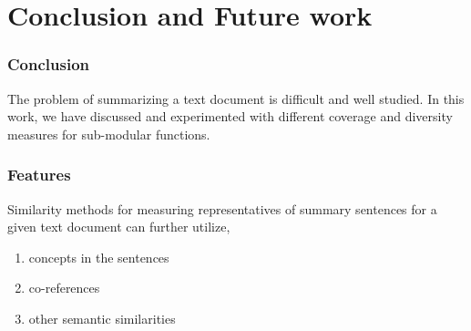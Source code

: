 \chapter{Conclusion and Future work}

\subsection{Conclusion}

The problem of summarizing a text document is difficult and well studied. In this work, we have discussed and experimented with different coverage and diversity measures for sub-modular functions.

\subsection{Features}

Similarity methods for measuring representatives of summary sentences for a given text document can further utilize, 

\begin{enumerate}
	\item concepts in the sentences
	\item co-references
	\item other semantic similarities 
\end{enumerate}
